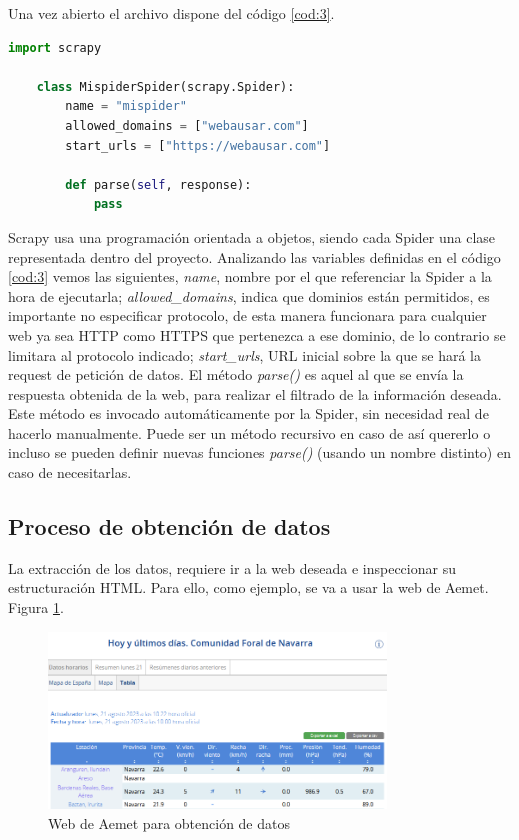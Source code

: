 Una vez abierto el archivo dispone del código \ref{cod:3}.

\begin{lstlisting}[language=Python, caption={Spider recién generada}, label=cod:3]
	import scrapy
	
	class MispiderSpider(scrapy.Spider):
		name = "mispider"
		allowed_domains = ["webausar.com"]
		start_urls = ["https://webausar.com"]
	
		def parse(self, response):
			pass
\end{lstlisting}

Scrapy usa una programación orientada a objetos, siendo cada Spider una clase representada dentro del proyecto.\newline
\newline
Analizando las variables definidas en el código \ref{cod:3} vemos las siguientes, \textit{name}, nombre por el que referenciar la Spider a la hora de ejecutarla; \textit{allowed\_domains}, indica que dominios están permitidos, es importante no especificar protocolo, de esta manera funcionara para cualquier web ya sea HTTP como HTTPS que pertenezca a ese dominio, de lo contrario se limitara al protocolo indicado; \textit{start\_urls}, URL inicial sobre la que se hará la request de petición de datos.\newline
\newline
El método \textit{parse()} es aquel al que se envía la respuesta obtenida de la web, para realizar el filtrado de la información deseada. Este método es invocado automáticamente por la Spider, sin necesidad real de hacerlo manualmente. Puede ser un método recursivo en caso de así quererlo o incluso se pueden definir nuevas funciones \textit{parse()} (usando un nombre distinto) en caso de necesitarlas.

\subsection{Proceso de obtención de datos}
La extracción de los datos, requiere ir a la web deseada e inspeccionar su estructuración HTML. Para ello, como ejemplo, se va a usar la web de Aemet. Figura \ref{fig:ej13}.

\begin{figure} [H]
	\centering
	\includegraphics[width=0.8\textwidth]{fig/AemetCode.png}
	\caption[URL de inicio para obtener los códigos de las estaciones de Aemet]{Web de Aemet para obtención de datos}
	\label{fig:ej13}
\end{figure}

